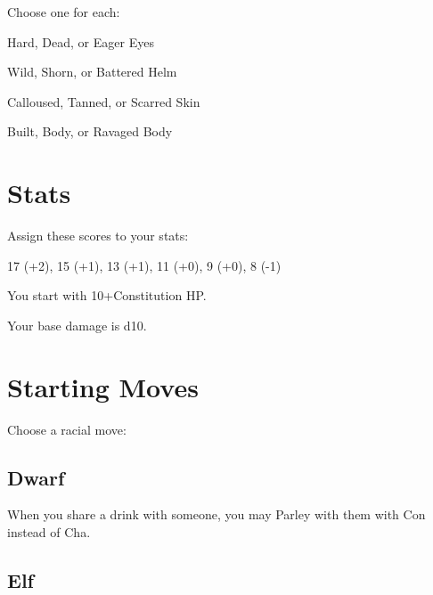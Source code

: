          

Choose one for each:

         

Hard, Dead, or Eager Eyes

         

Wild, Shorn, or Battered Helm

         

Calloused, Tanned, or Scarred Skin

         

Built, Body, or Ravaged Body

       

       
\section{Stats}   
       

         

Assign these scores to your stats:

         

17 (+2), 15 (+1), 13 (+1), 11 (+0), 9 (+0), 8 (-1)

         

You start with 10+Constitution HP.

       

       

Your base damage is d10.

       
\section{Starting Moves}   
       

         
\startInstructionsAfterHeader
Choose a racial move:
\stopInstructionsAfterHeader
         

           
\subsection{Dwarf}   
           

When you share a drink with someone, you may Parley with them with Con instead of Cha.

           
\subsection{Elf}   
           


